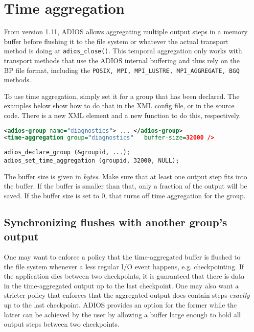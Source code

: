 \chapter{Time aggregation}
\label{sec:time_aggregation}

From version 1.11, ADIOS allows aggregating multiple output steps in a memory buffer before flushing it to the file system or whatever the actual transport method is doing at \verb+adios_close()+. This temporal aggregation only works with transport methods that use the ADIOS internal buffering and thus rely on the BP file format, including the \verb+POSIX, MPI, MPI_LUSTRE, MPI_AGGREGATE, BGQ+ methods.

To use time aggregation, simply set it for a group that has been declared. The examples below show how to do that in the XML config file, or in the source code. There is a new XML element and a new function to do this, respectively. 

\begin{lstlisting}[language=XML,caption=Set time aggregation for a group in XML]
<adios-group name="diagnostics"> ... </adios-group>    
<time-aggregation group="diagnostics"   buffer-size=32000 />
\end{lstlisting}

\begin{lstlisting}[caption=Set time aggregation for a group in source code]
adios_declare_group (&groupid, ...);
adios_set_time_aggregation (groupid, 32000, NULL);
\end{lstlisting}

The buffer size is given in {\em bytes}. Make sure that at least one output step fits into the buffer. If the buffer is smaller than that, only a fraction of the output will be saved. If the buffer size is set to $0$, that turns off time aggregation for the group.


\section{Synchronizing flushes with another group's output}

One may want to enforce a policy that the time-aggregated buffer is flushed to the file system whenever a less regular I/O event happens, e.g. checkpointing. If the application dies between two checkpoints, it is guaranteed that there is data in the time-aggregated output up to the last checkpoint. One may also want a stricter policy that enforces that the aggregated output does contain steps {\em exactly} up to the last checkpoint. ADIOS provides an option for the former while the latter can be achieved by the user by allowing a buffer large enough to hold all output steps between two checkpoints.  

